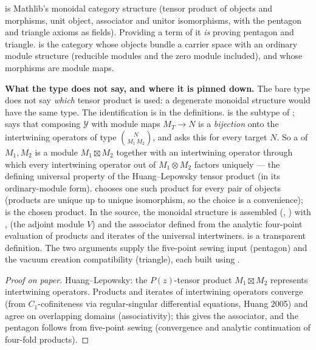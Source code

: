 \begin{dictionary}
 is Mathlib's monoidal category structure (tensor product of objects and morphisms, unit object,
associator and unitor isomorphisms, with the pentagon and triangle axioms as fields). Providing a term of it \emph{is}
proving pentagon and triangle.  is the category whose objects bundle a carrier space with an ordinary
module structure  (reducible modules and the zero module included), and whose morphisms are module maps.

\textbf{What the type does not say, and where it is pinned down.} The bare type 
does not say \emph{which} tensor product is used: a degenerate monoidal structure would have the same type. The
identification is in the definitions.  is the subtype of
;  says that composing $\mathcal Y$ with module maps
$M_T\to N$ is a \emph{bijection} onto the intertwining operators of type $\binom{N}{M_1\,M_2}$, and 
asks this for every target $N$. So a  of $M_1,M_2$ is a module $M_1\boxtimes M_2$ together with an
intertwining operator through which every intertwining operator out of $M_1\otimes M_2$ factors uniquely --- the
defining universal property of the Huang--Lepowsky tensor product (in its ordinary-module form). 
chooses one such product for every pair of objects (products are unique up to unique isomorphism, so the choice is a
convenience);  is the chosen product. In the source, the monoidal structure is assembled
(, ) with ,
 (the adjoint module $V$) and the associator defined from the analytic four-point
evaluation of products and iterates of the universal intertwiners.  is a transparent definition. The two
arguments  supply the five-point sewing input (pentagon) and the vacuum creation compatibility (triangle),
each built using .
\end{dictionary}

\begin{proof}[Proof on paper]
Huang--Lepowsky: the $P(z)$-tensor product $M_1\boxtimes M_2$ represents intertwining operators. Products and iterates of
intertwining operators converge (from $C_1$-cofiniteness via regular-singular differential equations, Huang 2005) and
agree on overlapping domains (associativity); this gives the associator, and the pentagon follows from five-point
sewing (convergence and analytic continuation of four-fold products).
\end{proof}

